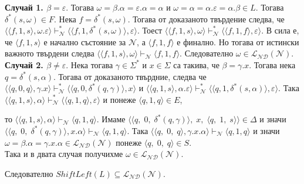 \documentclass[12pt]{article}
\begin{document}
\textbf{Случай 1. \(\beta = \varepsilon\)}. Тогава \(\omega = \beta.\alpha = \varepsilon.\alpha = \alpha\) и \(\omega = \alpha = \alpha.\varepsilon = \alpha.\beta \in L\). Тогава \(\delta^*(s, \omega) \in F\). Нека \(f = \delta^*(s, \omega)\).
Тогава от доказаното твърдение следва, че \(\langle \langle f, 1, s \rangle, \omega.\varepsilon \rangle \vdash_{\mathcal N}^* \langle \langle f, 1, \delta^*(s, \omega) \rangle, \varepsilon \rangle\). Тоест \(\langle \langle f, 1, s \rangle, \omega \rangle \vdash_{\mathcal N}^* \langle \langle f, 1, f \rangle, \varepsilon \rangle\).
В сила е, че \(\langle f, 1, s \rangle\) е начално състояние за \(\mathcal N\), а \(\langle f, 1, f \rangle\) е финално.
Но тогава от истински важното твърдени следва \(\langle \langle f, 1, s \rangle, \omega \rangle \vdash_{\mathcal N} \langle f, 1, f \rangle \). Следователно \(\omega \in \mathcal{L_{ND}}(\mathcal N)\). \\

\textbf{Случай 2. \(\beta \neq \varepsilon\)}. Нека тогава \(\gamma \in \Sigma^*\) и \(x \in \Sigma\) са такива, че
\(\beta = \gamma.x\). Тогава нека \(q = \delta^*(s, \alpha)\). Тогава от доказаното твърдние, следва че
\(\langle \langle q, 0, q \rangle, \gamma.x \rangle \vdash_{\mathcal N}^* \langle \langle q, 0, \delta^*(q, \gamma) \rangle, x \rangle\) и \(\langle \langle q, 1, s \rangle, \alpha.\varepsilon \rangle \vdash_{\mathcal N}^* \langle \langle q, 1, \delta^*(s, \alpha) \rangle, \varepsilon \rangle\).
Така \(\langle \langle q, 1, s \rangle, \alpha\rangle \vdash_{\mathcal N}^* \langle \langle q, 1, q \rangle, \varepsilon \rangle\) и понеже \(\langle q, 1, q \rangle \in E\),

то \(\langle \langle q, 1, s \rangle, \alpha\rangle \vdash_{\mathcal N} \langle q, 1, q \rangle \).
Имаме \(\langle \langle q,\; 0,\; \delta^*(q, \gamma) \rangle,\; x,\; \langle q,\; 1,\; s \rangle \rangle \in \Delta\) и значи \(\langle \langle q,\; 0,\; \delta^*(q, \gamma) \rangle, x.\alpha \rangle \vdash_{\mathcal N} \langle q, 1, q \rangle\). Така \(\langle \langle q,\; 0,\; q \rangle, \gamma.x.\alpha \rangle \vdash_{\mathcal N} \langle q, 1, q \rangle\) и значи \(\omega = \beta.\alpha = \gamma.x.\alpha \in \mathcal{L_{ND}}(\mathcal N)\) понеже 
\(\langle q,\; 0,\; q \rangle \in S\). \\

Така и в двата случая получихме \(\omega \in \mathcal{L_{ND}}(\mathcal N)\).


Следователно \(ShiftLeft(L) \subseteq \mathcal{L_{ND}}(\mathcal N)\).
\end{document}
